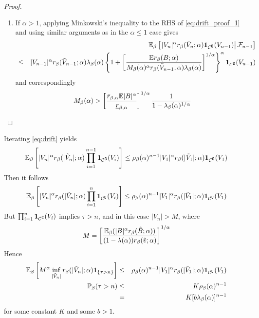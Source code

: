 \documentclass[aoas,preprint]{imsart}
\numberwithin{equation}{section}
\theoremstyle{plain}
\begin{document}
\begin{proof}
\begin{enumerate}
    \item If $\alpha > 1$, applying Minkowski's inequality to the RHS
      of \eqref{eq:drift_proof_1} and using similar arguments as in
      the $\alpha \leq 1$ case gives
      \begin{eqnarray*}
        && \mathbb{E}_\beta \left[ \left.
          |V_n|^\alpha r_\beta(\tilde V_{n}; \alpha)
          \mathbf{1}_{\mathcal C^\complement}(V_{n-1})
          \right| \mathcal F_{n-1}
        \right] \\
        &\leq&
        |V_{n-1}|^\alpha r_\beta(\tilde V_{n-1}; \alpha)
        \lambda_\beta(\alpha) \left\{
          1 + \left[
            {
              \mathbb{E} r_\beta(B; \alpha)
              \over
              M_\beta(\alpha)^\alpha
              r_\beta(\tilde V_{n-1}; \alpha)
              \lambda_\beta(\alpha)
            }
          \right]^{1/\alpha}
          \right\}^\alpha
          \mathbf{1}_{\mathcal C^\complement}(V_{n-1})
      \end{eqnarray*}
      and correspondingly
      \begin{equation*}
        M_\beta(\alpha) > \left[
          {
            \bar r_{\beta,\alpha} \mathbb{E} |B|^\alpha
            \over
            \underline r_{\beta, \alpha}
          }
        \right]^{1/\alpha} {
          1 \over
          1 - \lambda_\beta(\alpha)^{1/\alpha}
        }
      \end{equation*}
  \end{enumerate}    
\end{proof}

\begin{remark}
  Iterating \eqref{eq:drift} yields
  \[
  \mathbb{E}_\beta \left[
    |V_n|^\alpha r_\beta(|\tilde V_n|; \alpha)
    \prod_{i=1}^{n-1}\mathbf{1}_{{\mathcal C}^\complement}(V_i)\right]
  \leq \rho_\beta(\alpha)^{n-1} |V_1|^\alpha r_\beta(|\tilde V_1|; \alpha) \mathbf{1}_{{\mathcal C}^\complement}(V_1)
  \]
  Then it follows
  \[
  \mathbb{E}_\beta \left[
    |V_n|^\alpha r_\beta(|\tilde V_n|; \alpha) \prod_{i=1}^{n}\mathbf{1}_{{\mathcal C}^\complement}(V_i)\right]
  \leq \rho_\beta(\alpha)^{n-1} |V_1|^\alpha r_\beta(|\tilde V_1|; \alpha) \mathbf{1}_{{\mathcal C}^\complement}(V_1)
  \]
  But $\prod_{i=1}^{n}\mathbf{1}_{{\mathcal C}^\complement}(V_i)$ implies $\tau > n$, and in this
  case $|V_n| > M$, where
  \[
  M = \left[
    \mathbb{E}_\beta (|B|^\alpha r_\beta(\tilde B; \alpha)) 
    \over
    (1 - \lambda(\alpha)) r_\beta(\tilde v; \alpha)
  \right]^{1/\alpha}
  \]
  Hence
  \begin{eqnarray}
    \mathbb{E}_\beta \left[
      M^\alpha \inf_{|\tilde V_n|} r_\beta(|\tilde V_n|; \alpha)
      \mathbf{1}_{\{\tau > n\}}\right]
    &\leq& \rho_\beta(\alpha)^{n-1} |V_1|^\alpha r_\beta(|\tilde V_1|;
    \alpha) \mathbf{1}_{{\mathcal C}^\complement}(V_1) \nonumber \\
    \mathbb{P}_\beta(\tau > n) &\leq& K \rho_\beta(\alpha)^{n-1} \nonumber \\
    &=& K [b \lambda_{\beta}(\alpha)]^{n-1} \label{eq:ret_time}
  \end{eqnarray}
  for some constant $K$ and some $b > 1$.
\end{remark}
\end{document}
